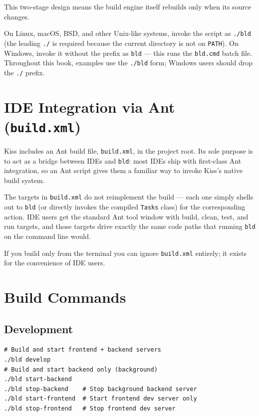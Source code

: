 \noindent
This two-stage design means the build engine itself rebuilds only when its source changes.

\begin{notebox}
On Linux, macOS, BSD, and other Unix-like systems, invoke the script as \texttt{./bld} (the leading \texttt{./} is required because the current directory is not on \texttt{PATH}).  On Windows, invoke it without the prefix as \texttt{bld} --- this runs the \texttt{bld.cmd} batch file.  Throughout this book, examples use the \texttt{./bld} form; Windows users should drop the \texttt{./} prefix.
\end{notebox}

\section{IDE Integration via Ant (\texttt{build.xml})}
\label{sec:build-ant}

Kiss includes an Ant build file, \texttt{build.xml}, in the project root.  Its sole purpose is to act as a bridge between IDEs and \texttt{bld}: most IDEs ship with first-class Ant integration, so an Ant script gives them a familiar way to invoke Kiss's native build system.

The targets in \texttt{build.xml} do not reimplement the build --- each one simply shells out to \texttt{bld} (or directly invokes the compiled \texttt{Tasks} class) for the corresponding action.  IDE users get the standard Ant tool window with build, clean, test, and run targets, and those targets drive exactly the same code paths that running \texttt{bld} on the command line would.

If you build only from the terminal you can ignore \texttt{build.xml} entirely; it exists for the convenience of IDE users.

\section{Build Commands}
\label{sec:build-commands}

\subsection{Development}

\begin{lstlisting}[style=shell]
# Build and start frontend + backend servers
./bld develop
# Build and start backend only (background)
./bld start-backend
./bld stop-backend    # Stop background backend server
./bld start-frontend  # Start frontend dev server only
./bld stop-frontend   # Stop frontend dev server
\end{lstlisting}

